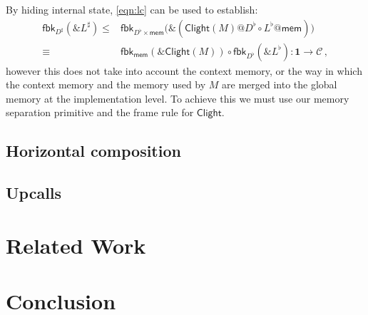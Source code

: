\documentclass[acmsmall,screen,review,anonymous]{acmart}
\newcommand{\kw}[1]{\ensuremath{ \mathsf{#1} }}
\begin{document}
By hiding internal state,
\autoref{eqn:lc} can be used to establish:
\begin{align*}
  \kw{fbk}_{D^\sharp}(\&L^\sharp) \le {} &
  \kw{fbk}_{D^\flat \times \kw{mem}} \big(
    \&(\kw{Clight}(M)@D^\flat \circ L^\flat@\kw{mem})
    \big) \\ \equiv {} &
  \kw{fbk}_\kw{mem}(\&\kw{Clight}(M)) \circ \kw{fbk}_{D^\flat}(\&L^\flat)
  : \mathbf{1} \rightarrow \mathcal{C}
  \,,
\end{align*}
however this does not take into account the context memory,
or the way in which the context memory and the memory used by $M$
are merged into the global memory
at the implementation level.
To achieve this we must use our memory separation primitive
and the frame rule for $\kw{Clight}$.



\subsection{Horizontal composition} %


\subsection{Upcalls} %



\section{Related Work}

\section{Conclusion}


\end{document}
